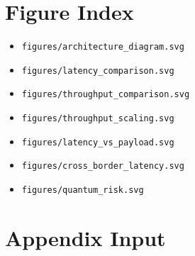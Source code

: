\documentclass[11pt]{article}
\begin{document}
\section*{Figure Index}
\begin{itemize}
\item \texttt{figures/architecture\_diagram.svg}
\item \texttt{figures/latency\_comparison.svg}
\item \texttt{figures/throughput\_comparison.svg}
\item \texttt{figures/throughput\_scaling.svg}
\item \texttt{figures/latency\_vs\_payload.svg}
\item \texttt{figures/cross\_border\_latency.svg}
\item \texttt{figures/quantum\_risk.svg}
\end{itemize}
\section*{Appendix Input}

\end{document}
